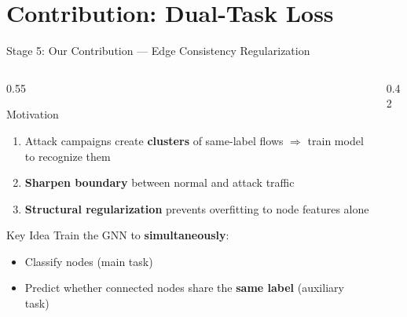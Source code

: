 \documentclass[aspectratio=169, 10pt]{beamer}
\begin{document}
\section{Contribution: Dual-Task Loss}

\begin{frame}{Stage 5: Our Contribution --- Edge Consistency Regularization}
\begin{columns}[T]
\begin{column}{0.55\textwidth}
\begin{block}{Motivation}
\begin{enumerate}
    \item Attack campaigns create \textbf{clusters} of same-label flows $\Rightarrow$ train model to recognize them
    \item \textbf{Sharpen boundary} between normal and attack traffic
    \item \textbf{Structural regularization} prevents overfitting to node features alone
\end{enumerate}
\end{block}
\vspace{0.3cm}
\begin{exampleblock}{Key Idea}
Train the GNN to \textbf{simultaneously}:
\begin{itemize}
    \item Classify nodes (main task)
    \item Predict whether connected nodes share the \textbf{same label} (auxiliary task)
\end{itemize}
\end{exampleblock}
\end{column}
\begin{column}{0.42\textwidth}
\centering
{}
\end{column}
\end{columns}
\end{frame}
\end{document}
